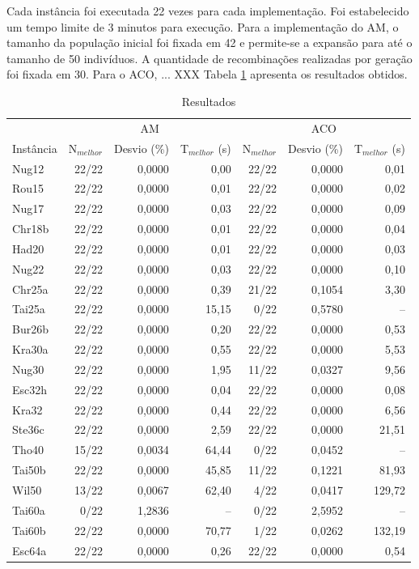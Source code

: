Cada instância foi executada 22 vezes para cada implementação. Foi
estabelecido um tempo limite de 3 minutos para execução.
Para a implementação do AM, o tamanho da população inicial foi fixada
em 42 e permite-se a expansão para até o tamanho de 50 indivíduos. A
quantidade de recombinações realizadas por geração foi fixada em 30.
Para o ACO, ... XXX
Tabela \ref{resultados} apresenta os resultados obtidos.

\begin{table}[H]
  \caption{Resultados \label{resultados}}
  \centering
  \begin{tabular}{l r r r r r r}
    \toprule
    & \multicolumn{3}{c}{AM} & \multicolumn{3}{c}{ACO} \\
    \cmidrule(r){2-4} \cmidrule(r){5-7}
    Instância & N$_{melhor}$ & Desvio (\%) & T$_{melhor}$ (s) & N$_{melhor}$
    & Desvio (\%) & T$_{melhor}$ (s)\\
    \midrule
    Nug12 & 22/22 & 0,0000 & 0,00 & 22/22 & 0,0000 & 0,01 \\
    Rou15 & 22/22 & 0,0000 & 0,01 & 22/22 & 0,0000 & 0,02 \\
    Nug17 & 22/22 & 0,0000 & 0,03 & 22/22 & 0,0000 & 0,09 \\
    Chr18b & 22/22 & 0,0000 & 0,01 & 22/22 & 0,0000 & 0,04 \\
    Had20 & 22/22 & 0,0000 & 0,01 & 22/22 & 0,0000 & 0,03 \\
    Nug22 & 22/22 & 0,0000 & 0,03 & 22/22 & 0,0000 & 0,10 \\
    Chr25a & 22/22 & 0,0000 & 0,39 & 21/22 & 0,1054 & 3,30 \\
    Tai25a & 22/22 & 0,0000 & 15,15 & 0/22 & 0,5780 & -- \\
    Bur26b & 22/22 & 0,0000 & 0,20 & 22/22 & 0,0000 & 0,53 \\
    Kra30a & 22/22 & 0,0000 & 0,55 & 22/22 & 0,0000 & 5,53 \\
    Nug30 & 22/22 & 0,0000 & 1,95 & 11/22 & 0,0327 & 9,56 \\
    Esc32h & 22/22 & 0,0000 & 0,04 & 22/22 & 0,0000 & 0,08 \\
    Kra32 & 22/22 & 0,0000 & 0,44 & 22/22 & 0,0000 & 6,56 \\
    Ste36c & 22/22 & 0,0000 & 2,59 & 22/22 & 0,0000 & 21,51 \\
    Tho40 & 15/22 & 0,0034 & 64,44 & 0/22 & 0,0452 & -- \\
    Tai50b & 22/22 & 0,0000 & 45,85 & 11/22 & 0,1221 & 81,93 \\
    Wil50 & 13/22 & 0,0067 & 62,40 & 4/22 & 0,0417 & 129,72 \\
    Tai60a & 0/22 & 1,2836 & -- & 0/22 & 2,5952 & -- \\
    Tai60b & 22/22 & 0,0000 & 70,77 & 1/22 & 0,0262 & 132,19 \\
    Esc64a & 22/22 & 0,0000 & 0,26 & 22/22 & 0,0000 & 0,54 \\
    \bottomrule
  \end{tabular}
\end{table}

